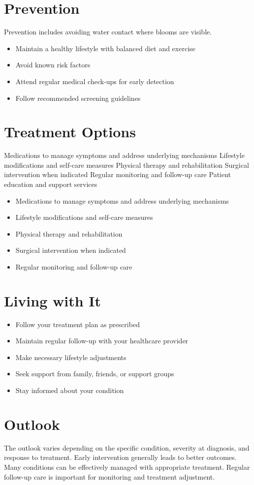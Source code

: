 \section{Prevention}
Prevention includes avoiding water contact where blooms are visible.

\begin{itemize}[noitemsep]
  \item Maintain a healthy lifestyle with balanced diet and exercise
  \item Avoid known risk factors
  \item Attend regular medical check-ups for early detection
  \item Follow recommended screening guidelines
\end{itemize}
\section{Treatment Options}
Medications to manage symptoms and address underlying mechanisms Lifestyle modifications and self-care measures Physical therapy and rehabilitation Surgical intervention when indicated Regular monitoring and follow-up care Patient education and support services

\begin{itemize}[noitemsep]
  \item Medications to manage symptoms and address underlying mechanisms
  \item Lifestyle modifications and self-care measures
  \item Physical therapy and rehabilitation
  \item Surgical intervention when indicated
  \item Regular monitoring and follow-up care
\end{itemize}
\section{Living with It}
\begin{itemize}[noitemsep]
  \item Follow your treatment plan as prescribed
  \item Maintain regular follow-up with your healthcare provider
  \item Make necessary lifestyle adjustments
  \item Seek support from family, friends, or support groups
  \item Stay informed about your condition
\end{itemize}
\section{Outlook}
The outlook varies depending on the specific condition, severity at diagnosis, and response to treatment. Early intervention generally leads to better outcomes. Many conditions can be effectively managed with appropriate treatment. Regular follow-up care is important for monitoring and treatment adjustment.
